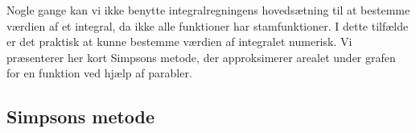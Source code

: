 Nogle gange kan vi ikke benytte integralregningens hovedsætning til at bestemme værdien af et integral, da ikke alle funktioner har stamfunktioner.
I dette tilfælde er det praktisk at kunne bestemme værdien af integralet numerisk.
Vi præsenterer her kort Simpsons metode, der approksimerer arealet under grafen for en funktion ved hjælp af parabler.

\subsection{Simpsons metode}%
\label{sub:Simpsons metode}


